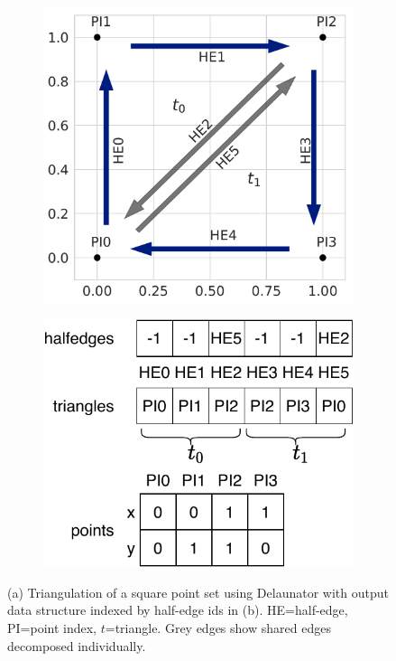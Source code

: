 \begin{figure}[ht]
    \centering
  \begin{subfigure}{.25\linewidth}
    \centering
    \includegraphics[width=0.99\linewidth]{chapter_2_polylidar/imgs/delaunator_tri-min.pdf}
    \caption{}
    \label{fig:ch2_delaunator_tri}
  \end{subfigure}
  \begin{subfigure}{.25\linewidth}
    \centering
    \includegraphics[width=.99\linewidth]{chapter_2_polylidar/imgs/DelaunatorDS.pdf}
    \caption{}
    \label{fig:ch2_delaunator_ds}
  \end{subfigure}
  \caption[Delaunay triangulation example]{(a) Triangulation of a square point set using Delaunator \cite{noauthor_github_2018} with output data structure indexed by half-edge ids in (b).  HE=half-edge, PI=point index, $t$=triangle. Grey edges show shared edges decomposed individually.}
  \label{fig:ch2_delaunator} 
\end{figure}


